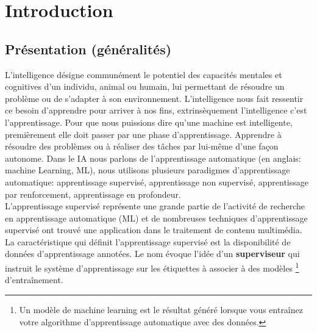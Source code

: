 
\chapter{Introduction}
	\section{Présentation (généralités)}
	
		L’intelligence désigne communément le potentiel des capacités mentales et cognitives d'un individu, animal ou humain, lui permettant de résoudre un problème ou de s'adapter à son environnement. L'intelligence nous fait ressentir ce besoin d’apprendre pour arriver à nos fins, extrinsèquement l'intelligence c’est l'apprentissage. Pour que nous puissions dire qu’une machine est intelligente, premièrement elle doit passer par une phase d'apprentissage.  Apprendre à résoudre des problèmes ou à réaliser des tâches par lui-même d’une façon autonome. Dans le IA nous parlons de l’apprentissage automatique (en anglais: machine Learning, ML), nous utilisons plusieurs paradigmes d’apprentissage automatique:  apprentissage supervisé, apprentissage non supervisé, apprentissage par renforcement, apprentissage en profondeur.\\
	
		L'apprentissage supervisé représente une grande partie de l'activité de recherche en apprentissage automatique (ML) et de nombreuses techniques d'apprentissage supervisé ont trouvé une application dans le traitement de contenu multimédia. La caractéristique qui définit l'apprentissage supervisé est la disponibilité de données d'apprentissage annotées\cite{cunningham2008supervised}. Le nom évoque l'idée d'un \textbf{superviseur} qui instruit le système d'apprentissage sur les étiquettes à associer à des modèles \footnote{Un modèle de machine learning est le résultat généré lorsque vous entraînez votre algorithme d'apprentissage automatique avec des données.} d'entraînement.\\ 
		
